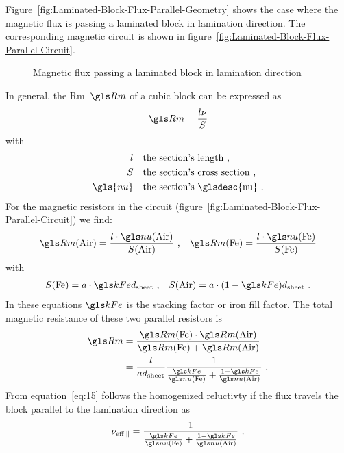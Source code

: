 Figure~\ref{fig:Laminated-Block-Flux-Parallel-Geometry} shows the
case where the magnetic flux is passing a laminated block in
lamination direction.  The corresponding magnetic circuit is shown in
figure~\ref{fig:Laminated-Block-Flux-Parallel-Circuit}.
\begin{figure}
  \centering
  \hfil
  \caption{Magnetic flux passing a laminated block in lamination direction}
  \label{fig:Lam-Mat-Flux-parallel}
\end{figure}
\label{sec:cart-coord}
In general, the \glsdesc{Rm}~$\Rm$ of a cubic block can be expressed as
\begin{gather}
  \Rm=\frac{l\nu}{S}
\end{gather}
with
\begin{align*}
  l&\quad\text{the section's length}\text{~,}\\
  S&\quad\text{the section's cross section}\text{~,}\\
  \gls{nu}&\quad\text{the section's \glsdesc{nu}}\text{~.}
\end{align*}
 For the magnetic resistors in the circuit
(figure~\ref{fig:Laminated-Block-Flux-Parallel-Circuit}) we find:
\begin{align}
  \RmAir=\frac{l\cdot\nuAir}{\SAir}\text{~,} &&
  \RmFe=\frac{l\cdot\nuFe}{\SFe}
\end{align}
with
\begin{align}
  \SFe=a\cdot \kFe \dsheet\text{~,} &&
  \SAir=a\cdot (1-\kFe) \dsheet\text{~.}
\end{align}
In these equations $\kFe$ is the stacking factor or iron fill factor.
The total magnetic resistance of these two parallel resistors is
\begin{gather}
  \label{eq:15}
\begin{split}
  \Rm&=\frac{\RmFe\cdot\RmAir}{\RmFe + \RmAir} \\
  &=\frac{l}{a\dsheet}
    \frac{1}{\frac{\kFe}{\nuFe}+\frac{1-\kFe}{\nuAir}}\text{~.}
\end{split}
\end{gather}
From equation~\eqref{eq:15} follows the homogenized reluctivty if the
flux travels the block parallel to the lamination direction as
\begin{gather}
  \nueffpar=\frac{1}{\frac{\kFe}{\nuFe}+\frac{1-\kFe}{\nuAir}}\text{~.}
\end{gather}


